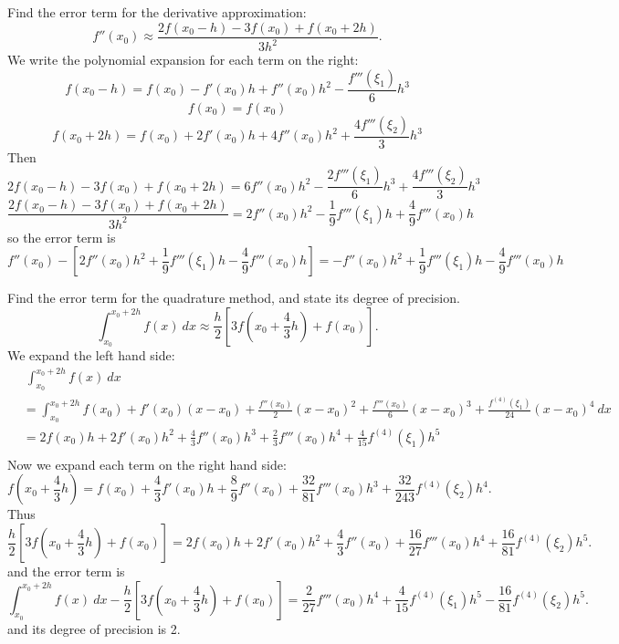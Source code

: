 \documentclass{eh-homework}
\begin{document}
    \begin{question}{1}
        Find the error term for the derivative approximation:
        \[
            f''(x_0) \approx \frac{2f(x_0 - h) - 3f(x_0) + f(x_0 + 2h)}{3h^2}.
        \]
        We write the polynomial expansion for each term on the right:
        \[
            f(x_0 - h) = f(x_0) - f'(x_0)h +f''(x_0)h^2 - \frac{f'''(\xi_1)}{6}h^3
        \]
        \[
            f(x_0) = f(x_0)
        \]
        \[
            f(x_0 + 2h) = f(x_0) + 2f'(x_0)h + 4f''(x_0)h^2 + \frac{4f'''(\xi_2)}{3}h^3
        \]
        Then
        \[
            2f(x_0 - h) - 3f(x_0) + f(x_0 + 2h) = 6f''(x_0)h^2 -\frac{2f'''(\xi_1)}{6}h^3 + \frac{4f'''(\xi_2)}{3}h^3
        \]
        \[
            \frac{2f(x_0 - h) - 3f(x_0) + f(x_0 + 2h)}{3h^2} = 2f''(x_0)h^2 - \frac{1}{9}f'''(\xi _1)h + \frac{4}{9}f'''(x_0)h
        \]
        so the error term is
        \[
            f''(x_0) - \left[2f''(x_0)h^2 + \frac{1}{9}f'''(\xi _1)h - \frac{4}{9}f'''(x_0)h \right] = - f''(x_0)h^2 + \frac{1}{9}f'''(\xi _1)h - \frac{4}{9}f'''(x_0)h
        \]
    \end{question}
    \newpage
    \begin{question}{2}
        Find the error term for the quadrature method, and state its degree of precision.
        \[
            \int _{x_0}^{x_0 + 2h}f(x)\ dx \approx \frac{h}{2}\left[ 3f \left( x_0 + \frac{4}{3}h \right) + f(x_0) \right].
        \]
        We expand the left hand side:
        \begin{align*}
            &\ \int _{x_0}^{x_0 + 2h} f(x)\ dx \\
            &= \int _{x_0}^{x_0 + 2h} f(x_0) + f'(x_0)(x - x_0) + \frac{f''(x_0)}{2}(x - x_0)^2 + \frac{f'''(x_0)}{6}(x - x_0)^3 + \frac{f^{(4)}(\xi_1)}{24}(x - x_0)^4\ dx \\
            &= 2f(x_0)h + 2f'(x_0)h^2 + \frac{4}{3}f''(x_0)h^3 + \frac{2}{3}f'''(x_0)h^4 + \frac{4}{15}f^{(4)}(\xi _1)h^5 \\
        \end{align*}
        Now we expand each term on the right hand side:
        \[
            f \left( x_0 + \frac{4}{3}h \right) = f(x_0) + \frac{4}{3}f'(x_0)h + \frac{8}{9}f''(x_0) + \frac{32}{81}f'''(x_0)h^3 + \frac{32}{243}f^{(4)}(\xi _2)h^4.
        \]
        Thus
        \[
            \frac{h}{2}\left[ 3f \left( x_0 + \frac{4}{3}h \right) + f(x_0) \right] = 2f(x_0)h + 2f'(x_0)h^2 + \frac{4}{3}f''(x_0) + \frac{16}{27}f'''(x_0)h^4 + \frac{16}{81}f^{(4)}(\xi_2)h^5.
        \]
        and the error term is
        \[
            \int _{x_0}^{x_0 + 2h}f(x)\ dx - \frac{h}{2}\left[ 3f \left( x_0 + \frac{4}{3}h \right) + f(x_0) \right] = \frac{2}{27}f'''(x_0)h^4 + \frac{4}{15}f^{(4)}(\xi _1)h^5 - \frac{16}{81}f^{(4)}(\xi _2)h^5.
        \]
        and its degree of precision is 2.
    \end{question}
\end{document}
